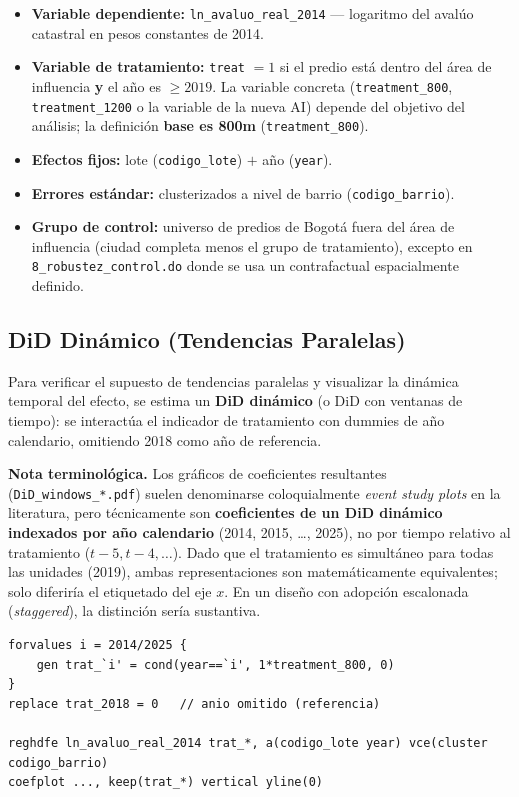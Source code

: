 \documentclass[12pt, a4paper]{article}
\begin{document}
\begin{itemize}
  \item \textbf{Variable dependiente:} \texttt{ln\_avaluo\_real\_2014} — logaritmo del avalúo catastral en pesos constantes de 2014.
  \item \textbf{Variable de tratamiento:} \texttt{treat} $= 1$ si el predio está dentro del área de influencia \textbf{y} el año es $\geq 2019$. La variable concreta (\texttt{treatment\_800}, \texttt{treatment\_1200} o la variable de la nueva AI) depende del objetivo del análisis; la definición \textbf{base es 800m} (\texttt{treatment\_800}).
  \item \textbf{Efectos fijos:} lote (\texttt{codigo\_lote}) $+$ año (\texttt{year}).
  \item \textbf{Errores estándar:} clusterizados a nivel de barrio (\texttt{codigo\_barrio}).
  \item \textbf{Grupo de control:} universo de predios de Bogotá fuera del área de influencia (ciudad completa menos el grupo de tratamiento), excepto en \texttt{8\_robustez\_control.do} donde se usa un contrafactual espacialmente definido.
\end{itemize}

\subsection{DiD Dinámico (Tendencias Paralelas)}

Para verificar el supuesto de tendencias paralelas y visualizar la dinámica temporal del efecto, se estima un \textbf{DiD dinámico} (o DiD con ventanas de tiempo): se interactúa el indicador de tratamiento con dummies de año calendario, omitiendo 2018 como año de referencia.

\begin{notebox}
\textbf{Nota terminológica.} Los gráficos de coeficientes resultantes (\texttt{DiD\_windows\_*.pdf}) suelen denominarse coloquialmente \textit{event study plots} en la literatura, pero técnicamente son \textbf{coeficientes de un DiD dinámico indexados por año calendario} (2014, 2015, \ldots, 2025), no por tiempo relativo al tratamiento ($t-5, t-4, \ldots$). Dado que el tratamiento es simultáneo para todas las unidades (2019), ambas representaciones son matemáticamente equivalentes; solo diferiría el etiquetado del eje $x$. En un diseño con adopción escalonada (\textit{staggered}), la distinción sería sustantiva.
\end{notebox}

\begin{lstlisting}[language={}]
forvalues i = 2014/2025 {
    gen trat_`i' = cond(year==`i', 1*treatment_800, 0)
}
replace trat_2018 = 0   // anio omitido (referencia)

reghdfe ln_avaluo_real_2014 trat_*, a(codigo_lote year) vce(cluster codigo_barrio)
coefplot ..., keep(trat_*) vertical yline(0)
\end{lstlisting}
\end{document}
